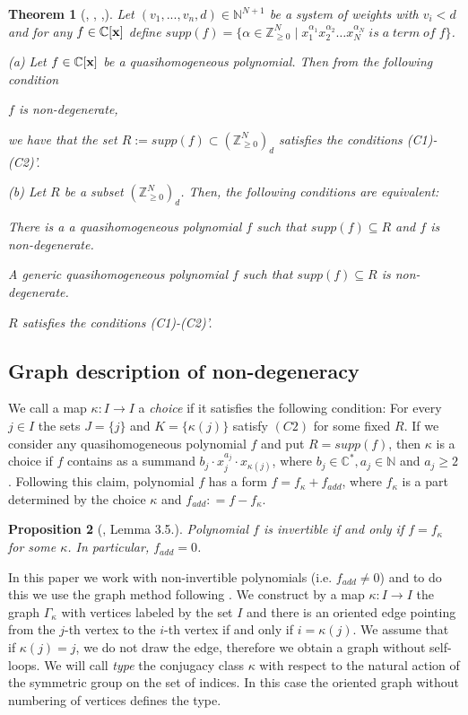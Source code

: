 \documentclass[reqno,12pt]{amsart}
\numberwithin{equation}{section}
\theoremstyle{plain}
\newtheorem{theorem}{Theorem}
\newtheorem{proposition}[theorem]{Proposition}
\theoremstyle{definition}
\newcommand{\CC}{{\mathbb{C}}}
\newcommand{\ZZ}{{\mathbb{Z}}}
\newcommand{\NN}{{\mathbb{N}}}
\newcommand{\bx}{{\bf x}}
\begin{document}
\begin{theorem}[\cite{HK}, \cite{Sa}, \cite{OPSh},\cite{KS}]{\label{NDcy}}
Let $(v_1,...,v_n,d)\in\NN^{N+1}$ be a system of weights with $v_i<d$ and for any $f\in \CC[\bx]$ define $supp(f) = \{ \alpha \in \ZZ_{\geq 0}^{N} \;|\; x_1^{\alpha_1}x_2^{\alpha_2}\dots x_N^{\alpha_N} \; is\; a\; term\; of\; f\} $.

(a) Let $f\in\CC[\bx]$ be a quasihomogeneous polynomial.
Then from the following condition
\begin{list}{}{}
\item[(IS1):] 
\quad $f$ is non-degenerate,
\end{list}

we have that the set $R := supp(f) \subset (\ZZ_{\geq 0}^N)_d$ satisfies the conditions (C1)-(C2)'.

\medskip
(b) Let $R$ be a subset $(\ZZ_{\geq 0}^N)_d$. Then, the following conditions are equivalent: 
\begin{list}{}{}
\item[(IS2):] \quad There is a a quasihomogeneous polynomial $f$ such that $ supp(f)\subseteq R$
and $f$ is non-degenerate.
\item[(IS2)':] \quad \quad A generic quasihomogeneous polynomial $f$ such that $supp(f) \subseteq R$ is non-degenerate.
\item[(C1) to (C2)':] \quad $R$ satisfies the conditions (C1)-(C2)'.
\end{list}
\end{theorem}
\subsection{Graph description of non-degeneracy}\label{comb}
We call a map $\kappa\colon I \to I$ a \emph{choice} if it satisfies the following condition: For every $ j \in I$ the sets $J = \{j\}$ and $K = \{\kappa(j)\}$ satisfy $(C2)$ for some fixed $R$. If we consider any quasihomogeneous polynomial $f$ and put $R=supp(f)$, then $\kappa$ is a choice if $f$ contains as a summand $b_j\cdot x_j^{a_j}\cdot x_{\kappa(j)}$, where $b_j\in \CC^*, a_j \in \NN$ and $a_j \geq 2$. Following this claim, polynomial $f$ has a form $f = f_\kappa + f_{add}$, where $f_\kappa$ is a part determined by the choice $\kappa$ and $f_{add} : = f - f_\kappa$. 
\begin{proposition}[\cite{HK}, Lemma 3.5.]
    Polynomial $f$ is invertible if and only if $f = f_\kappa$ for some $\kappa$. In particular, $f_{add} = 0$.
\end{proposition}
In this paper we work with non-invertible polynomials (i.e. $f_{add} \neq 0$) and to do this we use the graph method following \cite{HK}. We construct by a map $\kappa: I\to I$ the graph $\Gamma_\kappa$ with vertices labeled by the set $I$ and there is an oriented edge pointing from the $j$-th vertex to the $i$-th vertex if and only if $i = \kappa(j)$. We assume that if $\kappa(j) = j$, we do not draw the edge, therefore we obtain a graph without self-loops. We will call \emph{type} the conjugacy class $\kappa$ with respect to the natural action of the symmetric group on the set of indices. In this case the oriented graph without numbering of vertices defines the type. 
\end{document}
